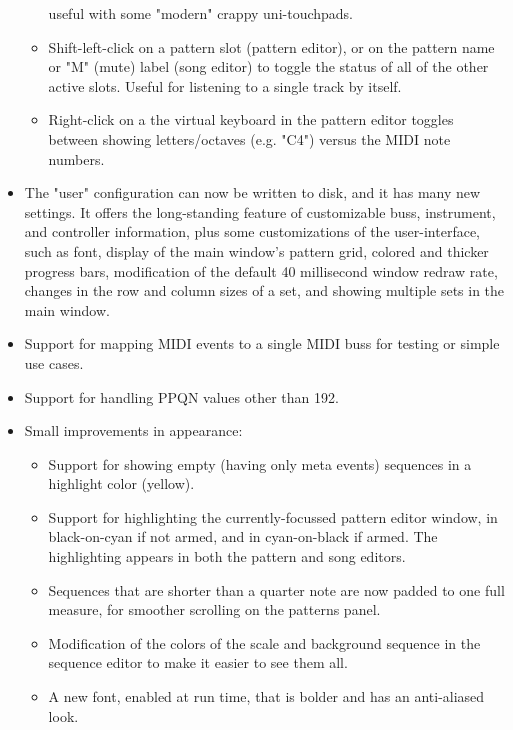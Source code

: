 \documentclass[
 11pt,
 twoside,
 a4paper,
 headinclude,
 footinclude,
 final                                 %
]{article}
\begin{document}
\begin{itemize}
\begin{itemize}
            useful with some "modern" crappy uni-touchpads.
         \item Shift-left-click on a pattern slot (pattern editor),
            or on the pattern name or "M" (mute) label (song editor)
            to toggle the status of all of the other active slots.
            Useful for listening to a single track by itself.
         \item Right-click on a the virtual keyboard in the pattern editor
            toggles between showing letters/octaves (e.g. "C4") versus
            the MIDI note numbers.  
      \end{itemize}
      \item The "user" configuration can now be written to disk, and 
         it has many new settings.  It offers the
         long-standing feature of customizable buss, instrument, and controller
         information, plus some customizations of the user-interface, such as
         font, display of the main window's pattern grid, colored and thicker
         progress bars, modification of the default 40 millisecond window
         redraw rate, changes in the row and column sizes of a set, and showing
         multiple sets in the main window.
      \item Support for mapping MIDI events to a single MIDI buss for testing
         or simple use cases.
      \item Support for handling PPQN values other than 192.
      \item Small improvements in appearance:
      \begin{itemize}
         \item Support for showing empty (having only meta
            events) sequences in a highlight color (yellow).
         \item Support for highlighting the currently-focussed pattern editor
            window, in black-on-cyan if not armed, and in cyan-on-black if
            armed.  The highlighting appears in both the pattern and song
            editors.
         \item Sequences that are shorter than a quarter note are now padded to
            one full measure, for smoother scrolling on the patterns panel.
         \item Modification of the colors of the scale and background sequence
            in the sequence editor to make it easier to see them all.
         \item A new font, enabled at run time, that is bolder and has an
            anti-aliased look.

\end{itemize}
\end{itemize}
\end{document}

